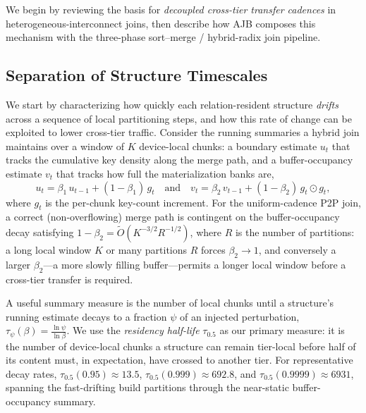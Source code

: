 \documentclass{article}
\begin{document}
We begin by reviewing the basis for \emph{decoupled cross-tier transfer
cadences} in heterogeneous-interconnect joins, then describe how AJB composes
this mechanism with the three-phase sort--merge / hybrid-radix join pipeline.

\subsection{Separation of Structure Timescales}
\label{sec:timescales}

We start by characterizing how quickly each relation-resident structure
\emph{drifts} across a sequence of local partitioning steps, and how this rate of
change can be exploited to lower cross-tier traffic. Consider the running
summaries a hybrid join maintains over a window of $K$ device-local chunks: a
boundary estimate $u_t$ that tracks the cumulative key density along the merge
path, and a buffer-occupancy estimate $v_t$ that tracks how full the
materialization banks are,
\begin{equation}
u_t = \beta_1\, u_{t-1} + (1-\beta_1)\, g_t
\quad\text{and}\quad
v_t = \beta_2\, v_{t-1} + (1-\beta_2)\, g_t \odot g_t,
\label{eq:ema}
\end{equation}
where $g_t$ is the per-chunk key-count increment. For the uniform-cadence P2P
join, a correct (non-overflowing) merge path is contingent on the
buffer-occupancy decay satisfying $1-\beta_2 = \tilde{O}(K^{-3/2}R^{-1/2})$,
where $R$ is the number of partitions: a long local window $K$ or many partitions
$R$ forces $\beta_2 \to 1$, and conversely a larger $\beta_2$---a more slowly
filling buffer---permits a longer local window before a cross-tier transfer is
required.

A useful summary measure is the number of local chunks until a structure's
running estimate decays to a fraction $\psi$ of an injected perturbation,
$\tau_\psi(\beta) = \frac{\ln \psi}{\ln \beta}$. We use the
\emph{residency half-life} $\tau_{0.5}$ as our primary measure: it is the number
of device-local chunks a structure can remain tier-local before half of its
content must, in expectation, have crossed to another tier. For representative
decay rates, $\tau_{0.5}(0.95) \approx 13.5$, $\tau_{0.5}(0.999) \approx 692.8$,
and $\tau_{0.5}(0.9999) \approx 6931$, spanning the fast-drifting build
partitions through the near-static buffer-occupancy summary.
\end{document}
